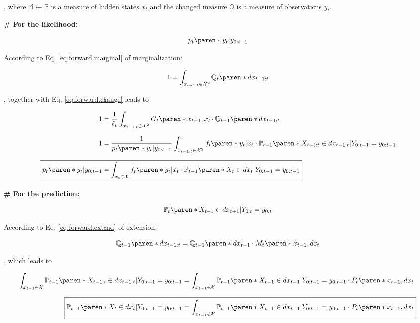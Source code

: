 , where $\mathbb{M} \leftarrow \mathbb{P}$ is a measure of hidden states $x_{t}$ and the changed measure $\mathbb{Q}$ is a measure of observations $y_{t}$.

\textbf{\# For the likelihood:}

\begin{equation*}
    p_{t} \paren*{y_{t} \vert y_{0:t-1}}
\end{equation*}

According to Eq. \eqref{eq.forward.marginal} of marginalization:

\begin{equation*}
    1 = \int_{x_{t-1:t} \in \mathcal{X}^{2}}
        \mathbb{Q}_{t} \paren*{dx_{t-1:t}}
\end{equation*}

, together with Eq. \eqref{eq.forward.change} leads to

\begin{align*}
1 &=
    \dfrac{1}{\ell_{t}}
    \int_{x_{t-1:t} \in \mathcal{X}^{2}}
    G_{t} \paren*{x_{t-1}, x_{t}} \cdot
    \mathbb{Q}_{t-1} \paren*{dx_{t-1:t}}
\\[1.5ex]
1 &=
    \dfrac{1}{ p_{t} \paren*{ y_{t} \vert y_{0:t-1} } }
    \int_{x_{t-1:t} \in \mathcal{X}^{2}}
    f_{t} \paren*{ y_{t} \vert x_{t} } \cdot
    \mathbb{P}_{t-1} \paren*{ X_{t-1:t} \in dx_{t-1:t} \vert Y_{0:t-1} = y_{0:t-1}}
\\[1.5ex]
\Aboxed{
    p_{t} \paren*{ y_{t} \vert y_{0:t-1} } &=
        \int_{x_{t} \in \mathcal{X}}
        f_{t} \paren*{ y_{t} \vert x_{t} } \cdot
        \mathbb{P}_{t-1} \paren*{ X_{t} \in dx_{t} \vert Y_{0:t-1} = y_{0:t-1}}
}
\end{align*}

\textbf{\# For the prediction:}

\begin{equation*}
    \mathbb{P}_{t} \paren*{ X_{t+1} \in dx_{t+1} \vert Y_{0:t} = y_{0:t} }
\end{equation*}

According to Eq. \eqref{eq.forward.extend} of extension:

\begin{equation*}
    \mathbb{Q}_{t-1} \paren*{dx_{t-1:t}} =
        \mathbb{Q}_{t-1} \paren*{dx_{t-1}}
        \cdot M_{t} \paren*{x_{t-1}, dx_{t}}
\end{equation*}

, which leads to

\begin{align*}
\int_{x_{t-1} \in \mathcal{X}} \mathbb{P}_{t-1}
    \paren*{ X_{t-1:t} \in dx_{t-1:t} \vert Y_{0:t-1} = y_{0:t-1}}
&=
    \int_{x_{t-1} \in \mathcal{X}} \mathbb{P}_{t-1}
    \paren*{ X_{t-1} \in dx_{t-1} \vert Y_{0:t-1} = y_{0:t-1}}
    \cdot P_{t} \paren*{x_{t-1}, dx_{t}}
\\[1.5ex]
\Aboxed{
    \mathbb{P}_{t-1}
        \paren*{ X_{t} \in dx_{t} \vert Y_{0:t-1} = y_{0:t-1}}
    &=
        \int_{x_{t-1} \in \mathcal{X}} \mathbb{P}_{t-1}
        \paren*{ X_{t-1} \in dx_{t-1} \vert Y_{0:t-1} = y_{0:t-1}}
        \cdot P_{t} \paren*{x_{t-1}, dx_{t}}
}
\end{align*}

